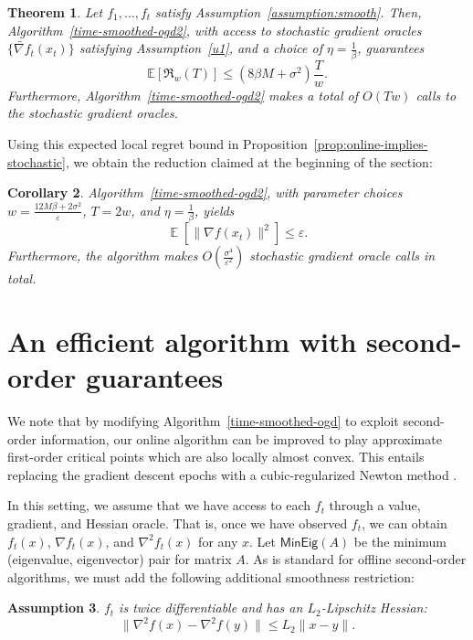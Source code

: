 \documentclass{article}
\def\norm#1{\mathopen\| #1 \mathclose\|}
\def\eps{\varepsilon}
\newcommand{\pa}[1]{\left(#1\right)}
\newcommand{\bra}[1]{\left[#1\right]}
\DeclareMathOperator*{\E}{\mathbb{E}}
\newtheorem{theorem}{Theorem}[section]
\newtheorem{corollary}[theorem]{Corollary}
\newcommand{\regret}{\mathfrak{R}}
\newtheorem{assumption}[theorem]{Assumption}
\begin{document}
\begin{theorem} 
\label{thm:onco-first2}
Let $f_1, \ldots, f_t$ satisfy Assumption~\ref{assumption:smooth}. Then, Algorithm~\ref{time-smoothed-ogd2}, with access to stochastic gradient oracles $\{\widetilde{\nabla f}_{t}(x_t)\}$ satisfying Assumption~\ref{u1}, and a choice of $\eta = \frac{1}{\beta}$, guarantees
\[\mathbb{E}\left[\regret_w(T)\right] \leq \pa{ 8\beta M + \sigma^2 } \frac{ T }{ w }.\]
Furthermore, Algorithm~\ref{time-smoothed-ogd2} makes a total of $O(Tw)$ calls to the stochastic gradient oracles.
\end{theorem}


Using this expected local regret bound in Proposition~\ref{prop:online-implies-stochastic}, we obtain the reduction claimed at the beginning of the section:

\begin{corollary}
Algorithm~\ref{time-smoothed-ogd2}, with parameter choices $w = \frac{12M\beta + 2\sigma^2}{\eps}$, $T=2w$, and $\eta = \frac{1}{\beta}$, yields
\[ \E\bra{ \norm{ \nabla f(x_t) }^2 } \leq \eps.\]
Furthermore, the algorithm makes $O\pa{ \frac{\sigma^4}{\eps^2} }$ stochastic gradient oracle calls in total.
\end{corollary}
 
\section{An efficient algorithm with second-order guarantees}

We note that by modifying Algorithm~\ref{time-smoothed-ogd} to exploit second-order information, our online algorithm can be improved to play approximate first-order critical points which are also locally almost convex. This entails replacing the gradient descent epochs with a cubic-regularized Newton method \cite{nesterovcubic,Lissa2}.

In this setting, we assume that we have access to each $f_t$ through a value, gradient, and Hessian oracle. That is, once we have observed $f_t$, we can obtain $f_t(x)$, $\nabla f_t(x)$, and $\nabla^2 f_t(x)$ for any $x$. Let $\mathsf{MinEig}(A)$ be the minimum (eigenvalue, eigenvector) pair for matrix $A$. As is standard for offline second-order algorithms, we must add the following additional smoothness restriction:
\begin{assumption}\label{third-order-smooth-assumption}
$f_t$ is twice differentiable and has an $L_2$-Lipschitz Hessian:
\begin{equation*}
\norm{\nabla^2 f(x) - \nabla^2 f(y)} \leq L_2 \norm{x - y}.
\end{equation*}
\end{assumption}
\end{document}
